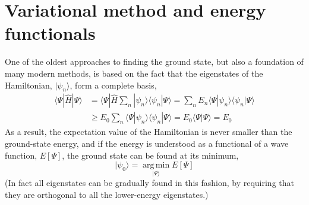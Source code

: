 \section{Variational method and energy functionals}

One of the oldest approaches to finding the ground state, but also a foundation of many modern methods, is based on the fact that the eigenstates of the Hamiltonian, $|\psi_n\rangle$, form a complete basis,
\begin{equation}
\begin{aligned}
  \langle\Psi|\hat H|\Psi\rangle
  &=\langle\Psi|\hat H\sum_n|\psi_n\rangle\langle\psi_n|\Psi\rangle
  =\sum_n E_n\langle\Psi|\psi_n\rangle\langle\psi_n|\Psi\rangle \\
  &\geq E_0\sum_n\langle\Psi|\psi_n\rangle\langle\psi_n|\Psi\rangle=E_0\langle\Psi|\Psi\rangle=E_0
\end{aligned}
\end{equation}
As a result, the expectation value of the Hamiltonian is never smaller than the ground-state energy, and if the energy is understood as a functional of a wave function, $E[\Psi]$, the ground state can be found at its minimum,
\begin{equation}
  |\psi_0\rangle=\operatorname*{arg\,min}_{|\Psi\rangle}E[\Psi]
  \label{eq:minimization}
\end{equation}
(In fact all eigenstates can be gradually found in this fashion, by requiring that they are orthogonal to all the lower-energy eigenstates.)

